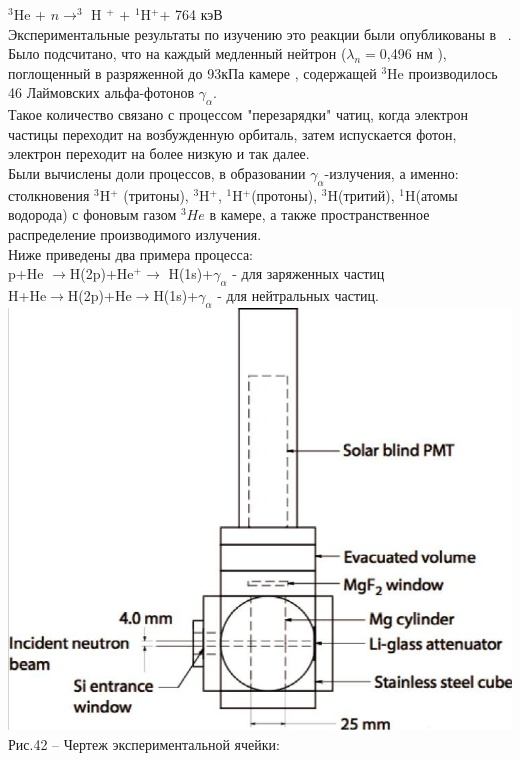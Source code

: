 \documentclass[11pt]{report}
\begin{document}
$^3 $He + $n \rightarrow ^3$ H $^{+}$ + $^1 $H$^{+}$+ 764 кэВ\\

Экспериментальные результаты по изучению это реакции были опубликованы в ~\cite{Lymon_2}. Было подсчитано, что на каждый медленный нейтрон ($\lambda_n=$0,496 нм ), поглощенный в разряженной до 93кПа камере , содержащей $^3 $He производилось 46 Лаймовских альфа-фотонов $\gamma_\alpha$.\\

Такое количество связано с процессом "перезарядки" чатиц, когда электрон частицы переходит на возбужденную орбиталь, затем испускается фотон, электрон переходит на более низкую и так далее.\\

Были вычислены доли процессов, в образовании $\gamma_\alpha$-излучения, а именно: столкновения $^3 $H$^{+}$ (тритоны), $^3 $H$^{+}$, $^1 $H$^{+}$(протоны), $^3 $H(тритий), $^1 $H(атомы водорода) с фоновым газом $^3 He$ в камере, а также пространственное распределение производимого излучения.\\

Ниже приведены два примера процесса:\\

p+He $ \rightarrow $H(2p)+He$ ^{+} \rightarrow $ H(1s)+$\gamma_\alpha$ - для заряженных частиц\\

H+He$ \rightarrow $H(2p)+He$ \rightarrow $H(1s)+$\gamma_\alpha$ - для нейтральных частиц.\\

\includegraphics[scale=0.5]{lyman}\\
Рис.42 -- Чертеж экспериментальной ячейки:\\
\end{document}
